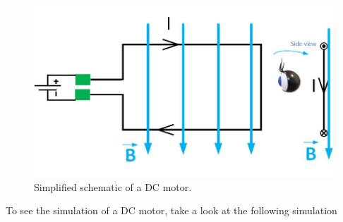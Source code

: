 \documentclass{ximera}
\begin{document}
\begin{figure}[htbp]
\begin{center}
\includegraphics[scale=0.5]{../jpg/dcMotor.jpg}
\end{center}
\caption{Simplified schematic of a DC motor. }
\label{fig:dcMotor}
\end{figure}


To see the simulation of a DC motor, take a look at the following simulation
\begin{center}  
\end{center}
\end{document}

